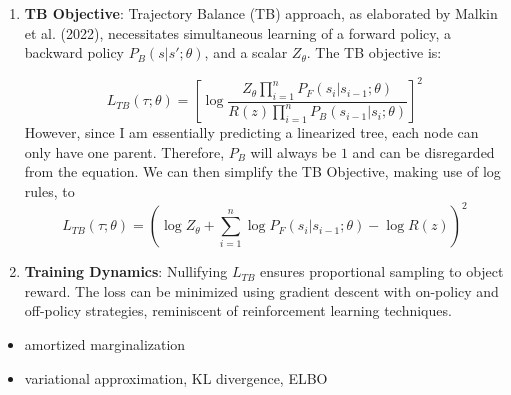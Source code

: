 \begin{enumerate}
    \item \textbf{TB Objective}: Trajectory Balance (TB) approach, as elaborated by Malkin et al. (2022), necessitates simultaneous learning of a forward policy, a backward policy $P_B(s|s'; \theta)$, and a scalar $Z_\theta$. The TB objective is:

\begin{equation}
    L_{TB}(\tau;\theta) = \left[\log\frac{Z_\theta \prod_{i=1}^{n} P_F(s_i|s_{i-1};\theta)}{R(z) \prod_{i=1}^{n} P_B(s_{i-1}|s_i;\theta)}\right]^2 
\end{equation} 
However, since I am essentially predicting a linearized tree, each node can only have one parent. Therefore, $P_B$ will always be $1$ and can be disregarded from the equation. We can then simplify the TB Objective, making use of log rules, to
\begin{equation}
     L_{TB}(\tau;\theta) = \left(\log Z_\theta + \sum_{i=1}^{n} \log P_F(s_i|s_{i-1};\theta) - \log R(z)\right)^2
\end{equation}
    
    \item \textbf{Training Dynamics}: Nullifying $L_{TB}$ ensures proportional sampling to object reward. The loss can be minimized using gradient descent with on-policy and off-policy strategies, reminiscent of reinforcement learning techniques.
    
\end{enumerate}

\begin{itemize}
    \item amortized marginalization
    \item variational approximation, KL divergence, ELBO    
\end{itemize}


